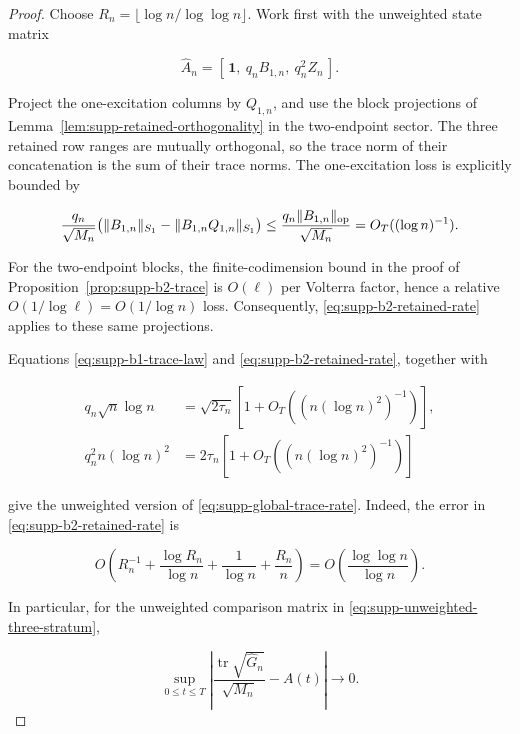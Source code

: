 \begin{proof}
Choose
\(R_n=\lfloor\log n/\log\log n\rfloor\).  Work first with the unweighted
state matrix

\[
 \widehat A_n=[\,\mathbf1,\ q_nB_{1,n},\ q_n^2Z_n\,].
\]

Project the one-excitation columns by \(Q_{1,n}\), and use the block
projections of Lemma~\ref{lem:supp-retained-orthogonality} in the
two-endpoint sector.  The three retained row ranges are mutually orthogonal,
so the trace norm of their concatenation is the sum of their trace norms.
The one-excitation loss is explicitly bounded by

\begin{equation}\label{eq:supp-b1-retained-loss}
 \frac{q_n}{\sqrt{M_n}}
 \bigl(\|B_{1,n}\|_{S_1}-\|B_{1,n}Q_{1,n}\|_{S_1}\bigr)
 \le\frac{q_n\|B_{1,n}\|_{\rm op}}{\sqrt{M_n}}
 =O_T((\log n)^{-1}).
\end{equation}

For the two-endpoint blocks, the finite-codimension bound in the proof of
Proposition~\ref{prop:supp-b2-trace} is \(O(\ell)\) per Volterra factor,
hence a relative \(O(1/\log\ell)=O(1/\log n)\) loss.  Consequently,
\eqref{eq:supp-b2-retained-rate} applies to these same projections.

Equations \eqref{eq:supp-b1-trace-law} and
\eqref{eq:supp-b2-retained-rate}, together with

\begin{align*}
 q_n\sqrt n\log n
 &=\sqrt{2\tau_n}\left[
 1+O_T\!\left((n(\log n)^2)^{-1}\right)\right],\\
 q_n^2n(\log n)^2
 &=2\tau_n\left[
 1+O_T\!\left((n(\log n)^2)^{-1}\right)\right]
\end{align*}

give the unweighted version of \eqref{eq:supp-global-trace-rate}.  Indeed,
the error in \eqref{eq:supp-b2-retained-rate} is

\[
 O\!\left(R_n^{-1}+\frac{\log R_n}{\log n}
 +\frac1{\log n}+\frac{R_n}{n}\right)
 =O\!\left(\frac{\log\log n}{\log n}\right).
\]

In particular, for the unweighted comparison matrix in
\eqref{eq:supp-unweighted-three-stratum},

\begin{equation}\label{eq:supp-unweighted-global-trace-limit}
 \sup_{0\le t\le T}\left|
 \frac{\operatorname{tr}\sqrt{\widehat G_n}}{\sqrt{M_n}}-A(t)
 \right|\longrightarrow0.
\end{equation}


\end{proof}
